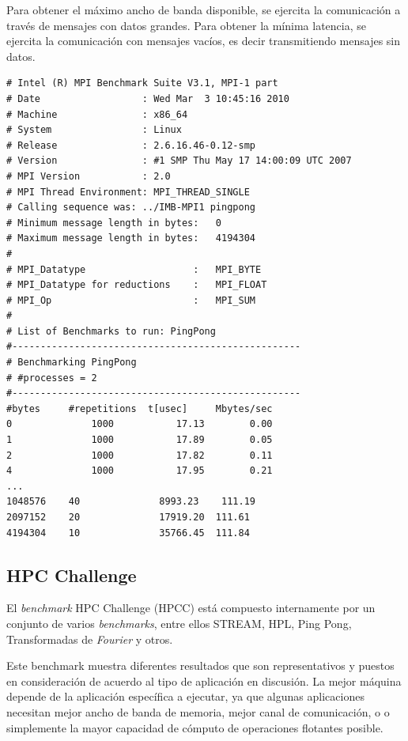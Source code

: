 \documentclass[a4paper]{report}
\begin{document}
\bigskip

Para obtener el m\'aximo ancho de banda disponible, se ejercita la comunicaci\'on a trav\'es de mensajes con datos grandes.
Para obtener la m\'inima latencia, se ejercita la comunicaci\'on con mensajes vac\'ios, es decir transmitiendo mensajes sin datos.

{\small
\begin{verbatim}
# Intel (R) MPI Benchmark Suite V3.1, MPI-1 part
# Date                  : Wed Mar  3 10:45:16 2010
# Machine               : x86_64
# System                : Linux
# Release               : 2.6.16.46-0.12-smp
# Version               : #1 SMP Thu May 17 14:00:09 UTC 2007
# MPI Version           : 2.0
# MPI Thread Environment: MPI_THREAD_SINGLE
# Calling sequence was: ../IMB-MPI1 pingpong
# Minimum message length in bytes:   0
# Maximum message length in bytes:   4194304
#
# MPI_Datatype                   :   MPI_BYTE
# MPI_Datatype for reductions    :   MPI_FLOAT
# MPI_Op                         :   MPI_SUM
#
# List of Benchmarks to run: PingPong
#---------------------------------------------------
# Benchmarking PingPong
# #processes = 2
#---------------------------------------------------
#bytes     #repetitions  t[usec]     Mbytes/sec
0              1000           17.13        0.00
1              1000           17.89        0.05
2              1000           17.82        0.11
4              1000           17.95        0.21
...
1048576    40              8993.23    111.19
2097152    20              17919.20  111.61
4194304    10              35766.45  111.84
\end{verbatim}
}

\subsection{HPC Challenge}

El {\it benchmark} HPC Challenge \cite{hpcc} (HPCC) est\'a compuesto internamente por un conjunto de
varios {\it benchmarks}, entre ellos STREAM, HPL, Ping Pong, Transformadas de {\it Fourier}
y otros.

\bigskip

Este benchmark muestra diferentes resultados que son representativos
y puestos en consideraci\'on de acuerdo al tipo de aplicaci\'on en discusi\'on.
La mejor m\'aquina depende de la aplicaci\'on espec\'ifica a ejecutar, ya que algunas
aplicaciones necesitan mejor ancho de banda de memoria, mejor canal de comunicaci\'on, o
o simplemente la mayor capacidad de c\'omputo de operaciones flotantes posible.
\end{document}
